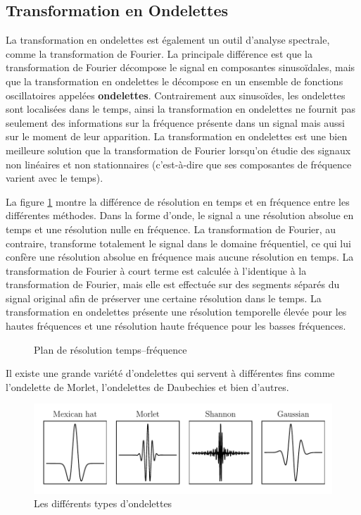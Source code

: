 \subsection{Transformation en Ondelettes}
La transformation en ondelettes est également un outil d'analyse spectrale, comme la transformation de Fourier. La principale différence est que la transformation de Fourier décompose le signal en composantes sinusoïdales, mais que la transformation en ondelettes le décompose en un ensemble de fonctions oscillatoires appelées \textbf{ondelettes}. Contrairement aux sinusoïdes, les ondelettes sont localisées dans le temps, ainsi la transformation en ondelettes ne fournit pas seulement des informations sur la fréquence présente dans un signal mais aussi sur le moment de leur apparition. La transformation en ondelettes est une bien meilleure solution que la transformation de Fourier lorsqu'on étudie des signaux non linéaires et non stationnaires (c'est-à-dire que ses composantes de fréquence varient avec le temps).

La figure \ref{fig:time-frequency-plane} montre la différence de résolution en temps et en fréquence entre les différentes méthodes. Dans la forme d'onde, le signal a une résolution absolue en temps et une résolution nulle en fréquence. La transformation de Fourier, au contraire, transforme totalement le signal dans le domaine fréquentiel, ce qui lui confère une résolution absolue en fréquence mais aucune résolution en temps. La transformation de Fourier à court terme est calculée à l'identique à la transformation de Fourier, mais elle est effectuée sur des segments séparés du signal original afin de préserver une certaine résolution dans le temps. La transformation en ondelettes présente une résolution temporelle élevée pour les hautes fréquences et une résolution haute fréquence pour les basses fréquences.

\begin{figure}[H]
    \centering
    
    \caption{Plan de résolution temps--fréquence}
    \label{fig:time-frequency-plane}
\end{figure}

Il existe une grande variété d'ondelettes qui servent à différentes fins comme l'ondelette de Morlet, l'ondelettes de Daubechies et bien d'autres.

\begin{figure}[H]
    \centering
    \includegraphics{figures/wavelets.pdf}
    \caption{Les différents types d'ondelettes}
    \label{fig:wavelets}
\end{figure}

